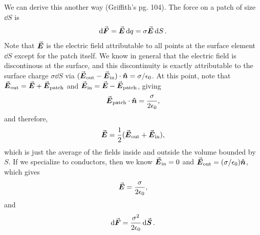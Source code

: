 We can derive this another way (Griffith's pg. 104).
The force on a patch of size $\dd{S}$ is
\begin{eqnarray}
    \dd{\va*{F}} = \va*{E} \dd{q} = \sigma \va*{E} \dd{S}
.\end{eqnarray}
Note that $\va*{E}$ is the electric field attributable to all points at the surface element $\dd{S}$ except for the patch itself.
We know in general that the electric field is discontinous at the surface, and this discontinuity is exactly attributable to the surface charge $\sigma \dd{S}$ via $(\va*{E}_{\rm out} - \va*{E}_{\rm in}) \cdot \vu*{n}= \sigma/\epsilon_0$.
At this point, note that $\va*{E}_{\rm out} = \va*{E} + \va*{E}_{\rm patch}$ and $\va*{E}_{\rm in} = \va*{E} - \va*{E}_{\rm patch}$, giving
\begin{eqnarray}
    \va*{E}_{\rm patch} \cdot \vu*{n} = \frac{\sigma}{2 \epsilon_0}
,\end{eqnarray}
and therefore,
\begin{eqnarray}
    \va*{E} = \frac{1}{2} (\va*{E}_{\rm out} + \va*{E}_{\rm in})
,\end{eqnarray}
which is just the average of the fields inside and outside the volume bounded by $S$.
If we specialize to conductors, then we know $\va*{E}_{\rm in} = 0$ and $\va*{E}_{\rm out} = (\sigma/\epsilon_0) \vu*{n}$, which gives
\begin{eqnarray}
    \va*{E} = \frac{\sigma}{2 \epsilon_0}
,\end{eqnarray}
and 
\begin{eqnarray}
    \dd{\va*{F}} = \frac{\sigma^2}{2 \epsilon_0} \dd{\va*{S}}
.\end{eqnarray} 



